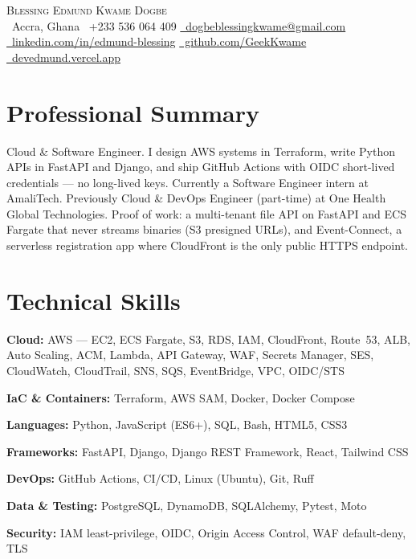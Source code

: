\documentclass[letterpaper,11pt]{article}
\begin{document}

\begin{center}
  {\Huge \scshape Blessing Edmund Kwame Dogbe}\\[5pt]
  \small
  \faMapMarker*\ Accra, Ghana \quad
  \faPhone\ +233 536 064 409 \quad
  \href{mailto:dogbeblessingkwame@gmail.com}{\faEnvelope\ dogbeblessingkwame@gmail.com}\\[3pt]
  \href{https://linkedin.com/in/edmund-blessing}{\faLinkedin\ linkedin.com/in/edmund-blessing} \quad
  \href{https://github.com/GeekKwame}{\faGithub\ github.com/GeekKwame} \quad
  \href{https://devedmund.vercel.app/}{\faGlobe\ devedmund.vercel.app}
\end{center}

\section{Professional Summary}
Cloud \& Software Engineer. I design AWS systems in Terraform, write Python APIs in FastAPI and Django, and ship GitHub Actions with OIDC short-lived credentials --- no long-lived keys. Currently a Software Engineer intern at AmaliTech. Previously Cloud \& DevOps Engineer (part-time) at One Health Global Technologies. Proof of work: a multi-tenant file API on FastAPI and ECS Fargate that never streams binaries (S3 presigned URLs), and Event-Connect, a serverless registration app where CloudFront is the only public HTTPS endpoint.

\section{Technical Skills}
\begin{itemize}[leftmargin=0in, label={}, itemsep=2pt]
  \small{
  \item \textbf{Cloud:} AWS --- EC2, ECS Fargate, S3, RDS, IAM, CloudFront, Route~53, ALB, Auto Scaling, ACM, Lambda, API Gateway, WAF, Secrets Manager, SES, CloudWatch, CloudTrail, SNS, SQS, EventBridge, VPC, OIDC/STS
  \item \textbf{IaC \& Containers:} Terraform, AWS SAM, Docker, Docker Compose
  \item \textbf{Languages:} Python, JavaScript (ES6+), SQL, Bash, HTML5, CSS3
  \item \textbf{Frameworks:} FastAPI, Django, Django REST Framework, React, Tailwind CSS
  \item \textbf{DevOps:} GitHub Actions, CI/CD, Linux (Ubuntu), Git, Ruff
  \item \textbf{Data \& Testing:} PostgreSQL, DynamoDB, SQLAlchemy, Pytest, Moto
  \item \textbf{Security:} IAM least-privilege, OIDC, Origin Access Control, WAF default-deny, TLS
  }
\end{itemize}
\end{document}
